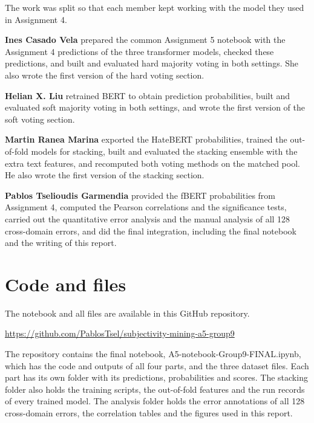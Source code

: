 \documentclass[11pt,a4paper]{article}
\begin{document}
The work was split so that each member kept working with the model they used in Assignment 4.

\textbf{Ines Casado Vela} prepared the common Assignment 5 notebook with the Assignment 4 predictions of the three transformer models, checked these predictions, and built and evaluated hard majority voting in both settings. She also wrote the first version of the hard voting section.

\textbf{Helian X. Liu} retrained BERT to obtain prediction probabilities, built and evaluated soft majority voting in both settings, and wrote the first version of the soft voting section.

\textbf{Martin Ranea Marina} exported the HateBERT probabilities, trained the out-of-fold models for stacking, built and evaluated the stacking ensemble with the extra text features, and recomputed both voting methods on the matched pool. He also wrote the first version of the stacking section.

\textbf{Pablos Tselioudis Garmendia} provided the fBERT probabilities from Assignment 4, computed the Pearson correlations and the significance tests, carried out the quantitative error analysis and the manual analysis of all 128 cross-domain errors, and did the final integration, including the final notebook and the writing of this report.

\section{Code and files}

The notebook and all files are available in this GitHub repository.

\begin{center}
\url{https://github.com/PablosTsel/subjectivity-mining-a5-group9}
\end{center}

The repository contains the final notebook, A5-notebook-Group9-FINAL.ipynb, which has the code and outputs of all four parts, and the three dataset files. Each part has its own folder with its predictions, probabilities and scores. The stacking folder also holds the training scripts, the out-of-fold features and the run records of every trained model. The analysis folder holds the error annotations of all 128 cross-domain errors, the correlation tables and the figures used in this report.
\end{document}
